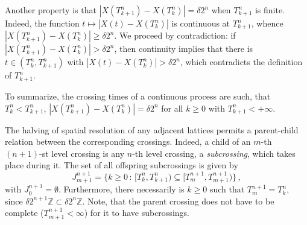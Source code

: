 \documentclass[a4paper]{article}
\begin{document}
Another property is that $|X(T_{k+1}^n) - X(T_k^n)| = \delta 2^n$ when $T_{k+1}^n$
is finite. Indeed, the function $t \mapsto |X(t) - X(T_k^n)|$ is continuous at $T_{k+1}^n$,
whence $|X(T_{k+1}^n) - X(T_k^n)| \geq \delta 2^n$. We proceed by contradiction:
if $|X(T_{k+1}^n) - X(T_k^n)| > \delta 2^n$, then continuity implies that there is
$t\in (T_k^n, T_{k+1}^n)$ with $|X(t) - X(T_k^n)| > \delta 2^n$, which contradicts
the definition of $T_{k+1}^n$.

To summarize, the crossing times of a continuous process are such, that $T_k^n < T_{k+1}^n$,
$|X(T_{k+1}^n) - X(T_k^n)| = \delta 2^n$ for all $k\geq0$ with $T_{k+1}^n < +\infty$.

The halving of spatial resolution of any adjacent lattices permits a parent-child
relation between the corresponding crossings. Indeed, a child of an $m$-th $(n+1)$-st
level crossing is any $n$-th level crossing, a \emph{subcrossing}, which takes place
during it. The set of all offspring subcrossings is given by
\begin{equation} \label{eq:crossing_offspring}
    J_{m+1}^{n+1}
        = \bigl\{ k \geq 0 \,:\,
            [T_k^n, T_{k+1}^n) \subseteq [T_m^{n+1}, T_{m+1}^{n+1})
        \bigr \} \,,
\end{equation}
with $J_0^{n+1} = \emptyset$. Furthermore, there necessarily is $k\geq 0$ such that
$T_m^{n+1} = T_k^n$, since $\delta 2^{n+1} \mathbb{Z} \subset \delta 2^n \mathbb{Z}$.
Note, that the parent crossing does not have to be complete ($T_{m+1}^{n+1} < \infty$)
for it to have subcrossings.
\end{document}
